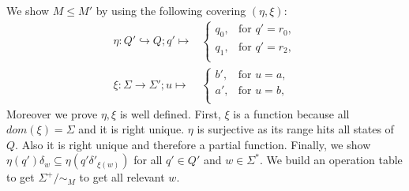 \documentclass[a4paper,12pt,numbers=noenddot]{scrreport}
\begin{document}
\section{}
We show $M \leq M'$ by using the following covering $(\eta, \xi)$:
\begin{align*}
    \eta: Q' \hookrightarrow Q; q' \mapsto &
        \begin{cases}
            q_0,      & \text{for } q' = r_0, \\
            q_1,      & \text{for } q' = r_2, \\
        \end{cases} \\
    \xi: \Sigma \rightarrow \Sigma'; u \mapsto &
        \begin{cases}
            b',      & \text{for } u = a, \\
            a',      & \text{for } u = b, \\
        \end{cases}
\end{align*}
Moreover we prove $\eta, \xi$ is well defined.
First, $\xi$ is a function because all $dom(\xi) = \Sigma$ and it is right unique.
$\eta$ is surjective as its range hits all states of $Q$.
Also it is right unique and therefore a partial function.
Finally, we show $\eta(q')\delta_w \subseteq \eta(q'\delta'_{\xi(w)})$ for all $q' \in Q'$ and $w \in \Sigma^*$.
We build an operation table to get $\Sigma^+ / \sim_M$ to get all relevant $w$.
\end{document}
